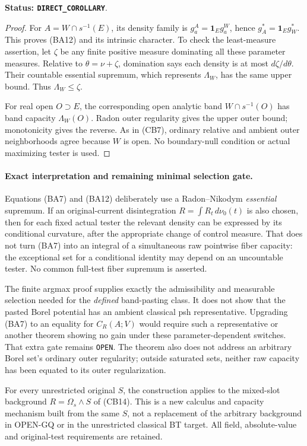 \documentclass[11pt,a4paper]{article}
\numberwithin{equation}{section}
\theoremstyle{definition}
\theoremstyle{remark}
\begin{document}
\noindent\textbf{Status: \texttt{DIRECT\_COROLLARY}}.

\begin{proof}
For $A=W\cap s^{-1}(E)$, its density family is
$g_a^A=\mathbf1_E g_a^W$, hence
$g_A^*=\mathbf1_Eg_W^*$. This proves (BA12) and its
intrinsic character. To check the least-measure assertion, let
$\zeta$ be any finite positive measure dominating all these
parameter measures. Relative to $\theta=\nu+\zeta$, domination
says each density is at most $d\zeta/d\theta$. Their countable
essential supremum, which represents $\Lambda_W$, has the same
upper bound. Thus $\Lambda_W\leq\zeta$.

For real open $O\supset E$, the corresponding open analytic
band $W\cap s^{-1}(O)$ has band capacity $\Lambda_W(O)$.
Radon outer regularity gives the upper outer bound; monotonicity
gives the reverse. As in (CB7), ordinary relative and ambient
outer neighborhoods agree because $W$ is open. No boundary-null
condition or actual maximizing tester is used.
\end{proof}

\paragraph{Exact interpretation and remaining minimal selection gate.}
Equations (BA7) and (BA12) deliberately use a Radon--Nikodym
\emph{essential} supremum. If an original-current disintegration
$R=\int R_t\,d\nu_0(t)$ is also chosen, then for each fixed
actual tester the relevant density can be expressed by its
conditional curvature, after the appropriate change of control
measure. That does not turn (BA7) into an integral of a
simultaneous raw pointwise fiber capacity: the exceptional set
for a conditional identity may depend on an uncountable tester.
No common full-test fiber supremum is asserted.

The finite argmax proof supplies exactly the admissibility and
measurable selection needed for the \emph{defined} band-pasting
class. It does not show that the pasted Borel potential has an
ambient classical psh representative. Upgrading (BA7) to an
equality for $C_R(A;V)$ would require such a representative or
another theorem showing no gain under these parameter-dependent
switches. That extra gate remains \texttt{OPEN}. The theorem
also does not address an arbitrary Borel set's ordinary outer
regularity; outside saturated sets, neither raw capacity has
been equated to its outer regularization.

For every unrestricted original $S$, the construction applies
to the mixed-slot background $R=\Omega_s\wedge S$ of (CB14).
This is a new calculus and capacity mechanism built from the
same $S$, not a replacement of the arbitrary background in
OPEN-GQ or in the unrestricted classical BT target. All field,
absolute-value and original-test requirements are retained.
\end{document}
